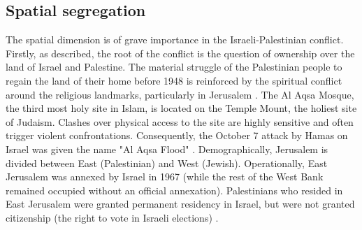 \documentclass[dissertation,math,vertlayout,pdfa,colorlinks]{aaltoseries}
\begin{document}
\subsection{Spatial segregation}
The spatial dimension is of grave importance in the Israeli-Palestinian conflict. Firstly, as described, the root of the conflict is the question of ownership over the land of Israel and Palestine. The material struggle of the Palestinian people to regain the land of their home before 1948 is reinforced by the spiritual conflict around the religious landmarks, particularly in Jerusalem \cite{kleinJerusalem2022}. The Al Aqsa Mosque, the third most holy site in Islam, is located on the Temple Mount, the holiest site of Judaism. Clashes over physical access to the site are highly sensitive and often trigger violent confrontations. Consequently, the October 7 attack by Hamas on Israel was given the name "Al Aqsa Flood" \cite{tarasiukGeostrategicImportanceTemple2023}. Demographically, Jerusalem is divided between East (Palestinian) and West (Jewish). Operationally, East Jerusalem was annexed by Israel in 1967 (while the rest of the West Bank remained occupied without an official annexation). Palestinians who resided in East Jerusalem were granted permanent residency in Israel, but were not granted citizenship (the right to vote in Israeli elections) \cite{kleinJerusalem2022}. 
\end{document}
